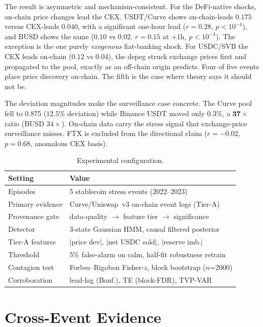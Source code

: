 \documentclass[sigconf,anonymous]{acmart}
\begin{document}
The result is asymmetric and mechanism-consistent.  For the DeFi-native shocks,
on-chain price changes lead the CEX. USDT/Curve shows on-chain-leads $0.175$
versus CEX-leads $0.040$, with a significant one-hour lead ($r=0.28$,
$p<10^{-4}$), and BUSD shows the same ($0.10$ vs $0.02$. $r=0.15$ at $+1$h,
$p<10^{-4}$).  The exception is the one purely \emph{exogenous} fiat-banking
shock. For USDC/SVB the CEX leads on-chain ($0.12$ vs $0.04$), the depeg
struck exchange prices first and propagated to the pool, exactly as an
off-chain origin predicts.  Four of five events place price discovery on-chain.
The fifth is the case where theory says it should not be.





The deviation magnitudes make the surveillance case concrete. The Curve pool fell to $0.875$ ($12.5\%$ deviation) while Binance USDT moved only $0.3\%$, a $\mathbf{37{\times}}$ ratio (BUSD $34\times$).  On-chain data carry the stress signal that exchange-price surveillance misses.  FTX is excluded from the directional claim ($r=-0.02$, $p=0.68$, anomalous CEX basis).

\begin{table}[t]
\centering
\caption{Experimental configuration.}
\label{tab:config}
\small
\setlength{\tabcolsep}{3pt}
\begin{tabular}{ll}
\toprule
Setting & Value \\
\midrule
Episodes & 5 stablecoin stress events (2022--2023) \\
Primary evidence & Curve/Uniswap~v3 on-chain event logs (Tier-A) \\
Provenance gate & data-quality $\to$ feature tier $\to$ significance \\
Detector & 3-state Gaussian HMM, causal filtered posterior \\
Tier-A features & $|$price dev$|$, $|$net USDC sold$|$, $|$reserve imb.$|$ \\
Threshold & 5\% false-alarm on calm, half-fit robustness retrain \\
Contagion test & Forbes--Rigobon Fisher-$z$, block bootstrap ($n$=2000) \\
Corroboration & lead-lag (Bonf.), TE (block-FDR), TVP-VAR \\
\bottomrule
\end{tabular}
\end{table}

\section{Cross-Event Evidence}
\label{sec:cross}
\end{document}
